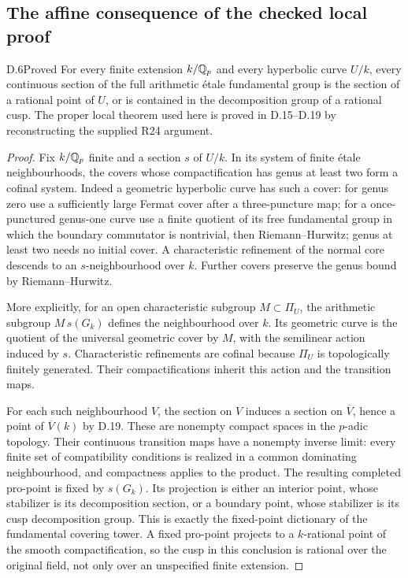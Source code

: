 \subsection{The affine consequence of the checked local proof}

\begin{claim}{D.6}{Proved}
For every finite extension $k/\mathbb Q_p$ and every hyperbolic curve
$U/k$, every continuous section of the full arithmetic
\'{e}tale fundamental group is the section of a rational point
of $U$, or is contained in the decomposition group of a rational
cusp. The proper local theorem used here is proved in D.15--D.19
by reconstructing the supplied R24 argument.
\end{claim}
\begin{proof}
Fix $k/\mathbb Q_p$ finite and a section $s$ of $U/k$. In its system of
finite \'etale neighbourhoods, the covers whose compactification
has genus at least two form a cofinal system. Indeed a geometric
hyperbolic curve has such a cover: for genus zero use a sufficiently
large Fermat cover after a three-puncture map; for a once-punctured
genus-one curve use a finite quotient of its free fundamental group
in which the boundary commutator is nontrivial, then
Riemann--Hurwitz; genus at least two needs no initial cover.
A characteristic refinement of the normal core descends to an
$s$-neighbourhood over $k$. Further covers preserve the
genus bound by Riemann--Hurwitz.

More explicitly, for an open characteristic subgroup
$M\subset\Pi_U$, the arithmetic subgroup $M\,s(G_k)$ defines
the neighbourhood over $k$. Its geometric curve is the quotient
of the universal geometric cover by $M$, with the semilinear
action induced by $s$. Characteristic refinements are cofinal
because $\Pi_U$ is topologically finitely generated. Their
compactifications inherit this action and the transition maps.

For each such neighbourhood $V$, the section on $V$ induces a
section on $\overline V$, hence a point of $\overline V(k)$ by
D.19. These are nonempty compact spaces in the
$p$-adic topology. Their continuous transition maps have a
nonempty inverse limit: every finite set of compatibility
conditions is realized in a common dominating neighbourhood, and
compactness applies to the product. The resulting completed
pro-point is fixed by $s(G_k)$. Its projection is either an
interior point, whose stabilizer is its decomposition section,
or a boundary point, whose stabilizer is its cusp decomposition
group. This is exactly the fixed-point dictionary of the
fundamental covering tower. A fixed pro-point projects to a
$k$-rational point of the smooth compactification, so the cusp
in this conclusion is rational over the original field, not
only over an unspecified finite extension.
\end{proof}

